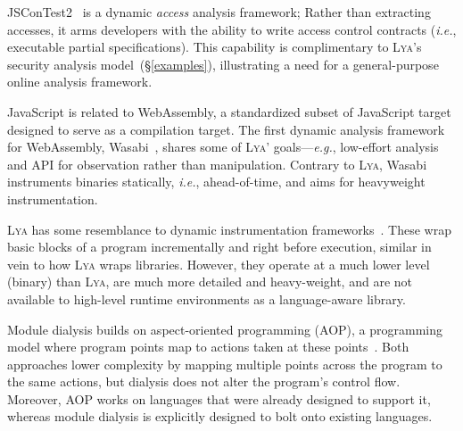 \documentclass[letterpaper,twocolumn,10pt]{article}
\def\eg{{\em e.g.}, }
\def\ie{{\em i.e.}, }
\newcommand{\sx}[1]{(\S\ref{#1})}
\newcommand{\sys}{{\scshape Lya}\xspace}
\newcommand{\fixme}[1]{{\color{red}#1}}
\begin{document}
JSConTest2~\cite{javascript2} is a dynamic \emph{access} analysis framework;
\fixme{Rather than extracting accesses, it arms developers with the ability to write access control contracts (\ie executable partial specifications)}.
This capability is complimentary to \sys's security analysis model~\sx{examples}, illustrating a need for a general-purpose online analysis framework.

JavaScript is related to WebAssembly, a standardized subset of JavaScript target designed to serve as a compilation target.
The first dynamic analysis framework for WebAssembly, Wasabi~\cite{wasabi}, shares some of \sys' goals---\eg low-effort analysis and API for observation rather than manipulation.
Contrary to \sys, Wasabi instruments binaries statically, \ie ahead-of-time, and aims for heavyweight instrumentation.

\sys has some resemblance to dynamic instrumentation frameworks~\cite{pin, valgrind, disl, roadrunner}.
These wrap basic blocks of a program incrementally and right before execution, similar in vein to how \sys wraps libraries.
However, they operate at a much lower level (binary) than \sys, are much more detailed and heavy-weight, and are not available to high-level runtime environments as a language-aware library.

Module dialysis builds on aspect-oriented programming (AOP), a programming model where program points map to actions taken at these points~\cite{aop}.
Both approaches lower complexity by mapping multiple points across the program to the same actions, but dialysis does not alter the program's control flow.
Moreover, AOP works on languages that were already designed to support it, whereas module dialysis is explicitly designed to bolt onto existing languages.
\end{document}
